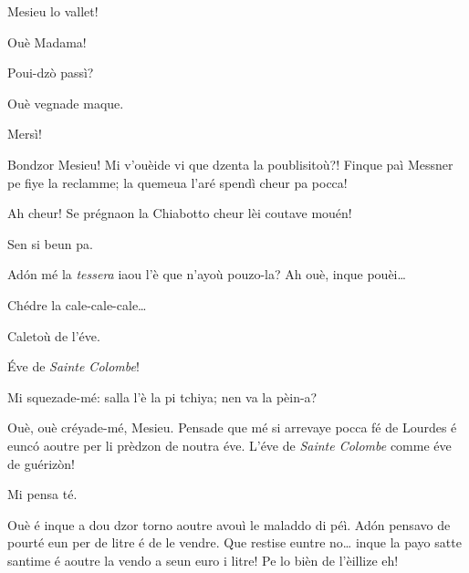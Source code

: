 \begin{drama}

\Seurspeaks Mesieu lo vallet!

\Valletspeaks Ouè Madama!

\Seurspeaks Poui-dzò passì?

\Valletspeaks Ouè vegnade maque.

\Seurspeaks Mersì!


\Seurspeaks{} Bondzor Mesieu! Mi v'ouèide vi que dzenta la poublisitoù?! Finque paì Messner pe fiye la reclamme; la quemeua l'aré spendì cheur pa pocca!

\Pierluigispeaks Ah cheur! Se prégnaon la Chiabotto cheur lèi coutave mouén!

\Seurspeaks Sen si beun pa.


\Seurspeaks{} Ad\'on mé la \textit{tessera} iaou l'è que n'ayoù pouzo-la? Ah ouè, inque pouèi\ldots


\Machinaspeaks Chédre la cale-cale-cale\ldots


\Machinaspeaks Caletoù de l'éve.

\Seurspeaks  \'Eve de \textit{Sainte Colombe}!

\Pierluigispeaks Mi squezade-mé: salla l'è la pi tchiya; nen va la pèin-a?

\Seurspeaks Ouè, ouè créyade-mé, Mesieu. Pensade que mé si arrevaye pocca fé de Lourdes é eunc\'o aoutre per li prèdzon de noutra éve. L'éve de \textit{Sainte Colombe} comme éve de guérizòn!

\Pierluigispeaks Mi pensa té.

\Seurspeaks Ouè é inque a dou dzor torno aoutre avouì le maladdo di péì. Ad\'on pensavo de pourté eun per de litre é de le vendre. Que restise euntre no\ldots {} inque la payo satte santime é aoutre la vendo a seun euro i litre! Pe lo bièn de l’èillize eh!


\end{drama}
